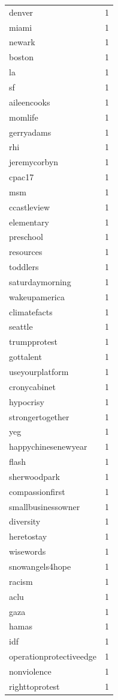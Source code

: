 \begin{tabular}{lr}
denver & 1 \\
miami & 1 \\
newark & 1 \\
boston & 1 \\
la & 1 \\
sf & 1 \\
aileencooks & 1 \\
momlife & 1 \\
gerryadams & 1 \\
rhi & 1 \\
jeremycorbyn & 1 \\
cpac17 & 1 \\
msm & 1 \\
ccastleview & 1 \\
elementary & 1 \\
preschool & 1 \\
resources & 1 \\
toddlers & 1 \\
saturdaymorning & 1 \\
wakeupamerica & 1 \\
climatefacts & 1 \\
seattle & 1 \\
trumpprotest & 1 \\
gottalent & 1 \\
useyourplatform & 1 \\
cronycabinet & 1 \\
hypocrisy & 1 \\
strongertogether & 1 \\
yeg & 1 \\
happychinesenewyear & 1 \\
flash & 1 \\
sherwoodpark & 1 \\
compassionfirst & 1 \\
smallbusinessowner & 1 \\
diversity & 1 \\
heretostay & 1 \\
wisewords & 1 \\
snowangels4hope & 1 \\
racism & 1 \\
aclu & 1 \\
gaza & 1 \\
hamas & 1 \\
idf & 1 \\
operationprotectiveedge & 1 \\
nonviolence & 1 \\
righttoprotest & 1 \\

\end{tabular}
